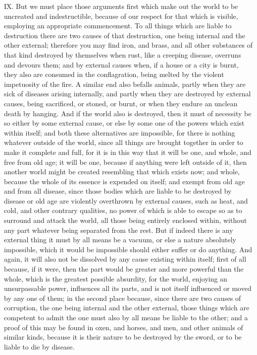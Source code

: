 IX. But we must place those arguments first which make out the world to be uncreated and
indestructible, because of our respect for that which is visible, employing an appropriate
commencement. To all things which are liable to destruction there are two causes of that
destruction, one being internal and the other external; therefore you may find iron, and brass, and
all other substances of that kind destroyed by themselves when rust, like a creeping disease,
overruns and devours them; and by external causes when, if a house or a city is burnt, they also
are consumed in the conflagration, being melted by the violent impetuosity of the fire. A similar end
also befalls animals, partly when they are sick of diseases arising internally, and partly when they
are destroyed by external causes, being sacrificed, or stoned, or burnt, or when they endure an
unclean death by hanging. And if the world also is destroyed, then it must of necessity be so either
by some external cause, or else by some one of the powers which exist within itself; and both
these alternatives are impossible, for there is nothing whatever outside of the world, since all things
are brought together in order to make it complete and full, for it is in this way that it will be one, and
whole, and free from old age; it will be one, because if anything were left outside of it, then another
world might be created resembling that which exists now; and whole, because the whole of its
essence is expended on itself; and exempt from old age and from all disease, since those bodies
which are liable to be destroyed by disease or old age are violently overthrown by external causes,
such as heat, and cold, and other contrary qualities, no power of which is able to escape so as to
surround and attack the world, all those being entirely enclosed within, without any part whatever
being separated from the rest. But if indeed there is any external thing it must by all means be a
vacuum, or else a nature absolutely impossible, which it would be impossible should either suffer or
do anything. And again, it will also not be dissolved by any cause existing within itself; first of all
because, if it were, then the part would be greater and more powerful than the whole, which is the
greatest possible absurdity, for the world, enjoying an unsurpassable power, influences all its parts,
and is not itself influenced or moved by any one of them; in the second place because, since there
are two causes of corruption, the one being internal and the other external, those things which are
competent to admit the one must also by all means be liable to the other; and a proof of this may be
found in oxen, and horses, and men, and other animals of similar kinds, because it is their nature
to be destroyed by the sword, or to be liable to die by disease.

